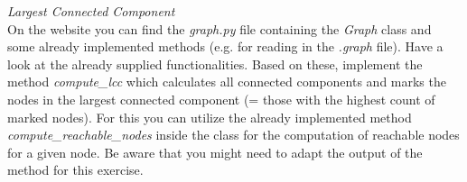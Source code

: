   \textit{Largest Connected Component}\\
On the website you can find the \emph{graph.py} file containing the \emph{Graph} 
class and some already implemented methods (e.g. for reading in the \emph{.graph} 
file). Have a look at the already supplied functionalities. Based on these, implement 
the method \emph{compute\_lcc} which calculates all connected components and marks 
the nodes in the largest connected component (= those with the highest count of 
marked nodes). For this you can utilize the already implemented method 
\emph{compute\_reachable\_nodes} inside the class for the computation of reachable 
nodes for a given node. Be aware that you might need to adapt the output of 
the method for this exercise.

